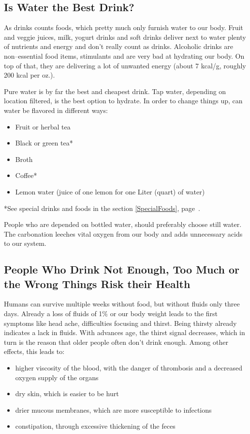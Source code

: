 \documentclass[../main.tex]{subfiles}
\begin{document}
  \subsection{Is Water the Best Drink?}

  As drinks counts foods, which pretty much only furnish water to our body. 
  Fruit and veggie juices, milk, yogurt drinks and soft drinks deliver next to water plenty of nutrients and energy and  don't really count as drinks.
  Alcoholic drinks are non--essential food items, stimulants and are very bad at hydrating our body.
  On top of that, they are delivering a lot of unwanted energy (about 7 kcal/g, roughly 200 kcal per oz.).

  
  Pure water is by far the best and cheapest drink. Tap water, depending on location filtered, is the best option to hydrate.
  In order to change things up, can water be flavored in different ways:
  \begin{itemize}
  \item Fruit or herbal tea
  \item Black or green tea* 
  \item Broth
  \item Coffee*
    \item Lemon water (juice of one lemon for one Liter (quart) of water)
  \end{itemize}
{\footnotesize{*See special drinks and foods in the section \ref{SpecialFoods}, page~\pageref{SpecialFoods}.}}
  
People who are depended on bottled water, should preferably choose still water.
  The carbonation leeches vital oxygen from our body and adds unnecessary acids to our system.

  \subsection[Drinking Too Little, Too Much or the Wrong Drinks]{People Who Drink Not Enough, Too Much or the Wrong Things Risk their Health}

  Humans can survive multiple weeks without food, but without fluids only three days.
  Already a loss of fluids of 1\% or our body weight leads to the first symptoms like head ache, difficulties focusing and thirst.
  Being thirsty already indicates a lack in fluids.
  With advances age, the thirst signal decreases, which in turn is the reason that older people often don't drink enough.
  Among other effects, this leads to:
  \begin{itemize}
  \item higher viscosity of the blood, with the danger of thrombosis and a decreased oxygen supply of the organs
  \item dry skin, which is easier to be hurt
  \item drier mucous membranes, which are more susceptible to infections
    \item constipation, through excessive thickening of the feces
    \end{itemize}
\end{document}
